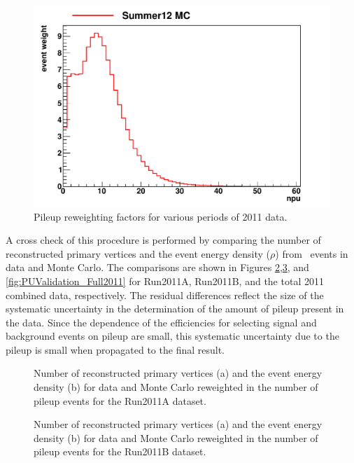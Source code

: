 \begin{figure}[hbt]
\begin{center}
\includegraphics[width=0.7\linewidth]{figures/ReweightingFactors.pdf}
\caption{\label{fig:PUReweightingFactors} Pileup reweighting factors for various periods of 2011 data.}
\end{center}
\end{figure}


A cross check of this procedure is performed by comparing the number of 
reconstructed primary vertices and the event energy density ($\rho$)
from \zmm\ events in data and Monte Carlo. The comparisons are shown in
Figures \ref{fig:PUValidation_Run2011A},\ref{fig:PUValidation_Run2011B},
and \ref{fig:PUValidation_Full2011} for Run2011A, Run2011B, and the 
total 2011 combined data, respectively. The residual differences 
reflect the size of the systematic uncertainty in the determination 
of the amount of pileup present in the data. Since the dependence 
of the efficiencies for selecting signal and background events on 
pileup are small, this systematic uncertainty due to the pileup 
is small when propagated to the final 
result.

\begin{figure}[hbt]
\begin{center}
\caption{\label{fig:PUValidation_Run2011A} Number of reconstructed primary vertices (a) and
the event energy density (b) for data and Monte Carlo reweighted in the number
of pileup events for the Run2011A dataset.}
\end{center}
\end{figure}

\begin{figure}[hbt]
\begin{center}
\caption{\label{fig:PUValidation_Run2011B} Number of reconstructed primary vertices (a) and
the event energy density (b) for data and Monte Carlo reweighted in the number
of pileup events for the Run2011B dataset.}
\end{center}
\end{figure}

